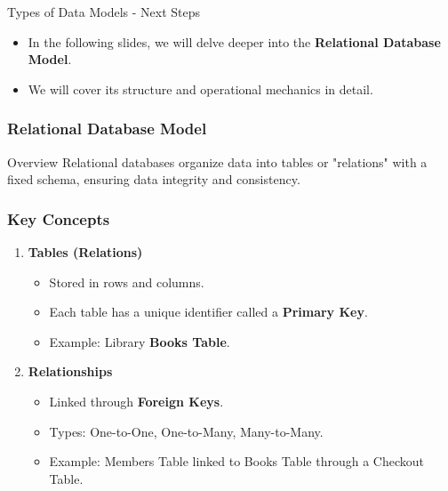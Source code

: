 \documentclass[aspectratio=169]{beamer}
\begin{document}
\begin{frame}[fragile]{Types of Data Models - Next Steps}
    \begin{itemize}
        \item In the following slides, we will delve deeper into the \textbf{Relational Database Model}.
        \item We will cover its structure and operational mechanics in detail.
    \end{itemize}
\end{frame}

\begin{frame}
    \frametitle{Relational Database Model}
    \begin{block}{Overview}
        Relational databases organize data into tables or "relations" with a fixed schema, ensuring data integrity and consistency.
    \end{block}
\end{frame}

\begin{frame}
    \frametitle{Key Concepts}
    \begin{enumerate}
        \item \textbf{Tables (Relations)}
            \begin{itemize}
                \item Stored in rows and columns.
                \item Each table has a unique identifier called a \textbf{Primary Key}.
                \item Example: Library \textbf{Books Table}.
            \end{itemize}

        \item \textbf{Relationships}
            \begin{itemize}
                \item Linked through \textbf{Foreign Keys}.
                \item Types: One-to-One, One-to-Many, Many-to-Many.
                \item Example: Members Table linked to Books Table through a Checkout Table.
            \end{itemize}
    \end{enumerate}
\end{frame}
\end{document}
